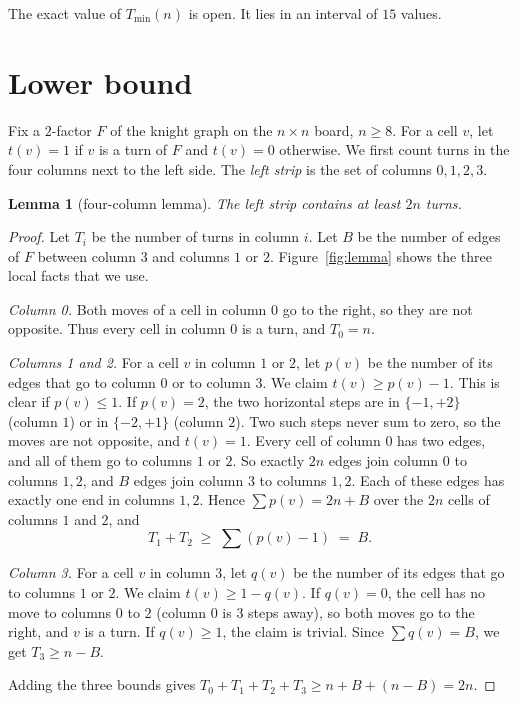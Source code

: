 \documentclass[11pt]{article}
\newtheorem{lemma}[theorem]{Lemma}
\theoremstyle{definition}
\theoremstyle{remark}
\newcommand{\Tmin}{T_{\min}}
\begin{document}
The exact value of $\Tmin(n)$ is open.
It lies in an interval of $15$ values.

\section{Lower bound}\label{sec:lower}

Fix a $2$-factor $F$ of the knight graph on the $n\times n$ board, $n\ge 8$.
For a cell $v$, let $t(v)=1$ if $v$ is a turn of $F$ and $t(v)=0$ otherwise.
We first count turns in the four columns next to the left side.
The \emph{left strip} is the set of columns $0,1,2,3$.

\begin{lemma}[four-column lemma]\label{lem:four}
The left strip contains at least $2n$ turns.
\end{lemma}

\begin{proof}
Let $T_i$ be the number of turns in column $i$.
Let $B$ be the number of edges of $F$ between column $3$ and columns $1$ or $2$.
Figure~\ref{fig:lemma} shows the three local facts that we use.

\emph{Column 0.}
Both moves of a cell in column $0$ go to the right, so they are not opposite.
Thus every cell in column $0$ is a turn, and $T_0=n$.

\emph{Columns 1 and 2.}
For a cell $v$ in column $1$ or $2$, let $p(v)$ be the number of its edges that go to column $0$ or to column $3$.
We claim $t(v)\ge p(v)-1$.
This is clear if $p(v)\le 1$.
If $p(v)=2$, the two horizontal steps are in $\{-1,+2\}$ (column $1$) or in $\{-2,+1\}$ (column $2$).
Two such steps never sum to zero, so the moves are not opposite, and $t(v)=1$.
Every cell of column $0$ has two edges, and all of them go to columns $1$ or $2$.
So exactly $2n$ edges join column $0$ to columns $1,2$, and $B$ edges join column $3$ to columns $1,2$.
Each of these edges has exactly one end in columns $1,2$.
Hence $\sum p(v)=2n+B$ over the $2n$ cells of columns $1$ and $2$, and
\[ T_1+T_2 \;\ge\; \sum (p(v)-1) \;=\; B. \]

\emph{Column 3.}
For a cell $v$ in column $3$, let $q(v)$ be the number of its edges that go to columns $1$ or $2$.
We claim $t(v)\ge 1-q(v)$.
If $q(v)=0$, the cell has no move to columns $0$ to $2$ (column $0$ is $3$ steps away), so both moves go to the right, and $v$ is a turn.
If $q(v)\ge1$, the claim is trivial.
Since $\sum q(v)=B$, we get $T_3\ge n-B$.

Adding the three bounds gives $T_0+T_1+T_2+T_3\ge n+B+(n-B)=2n$.
\end{proof}
\end{document}
